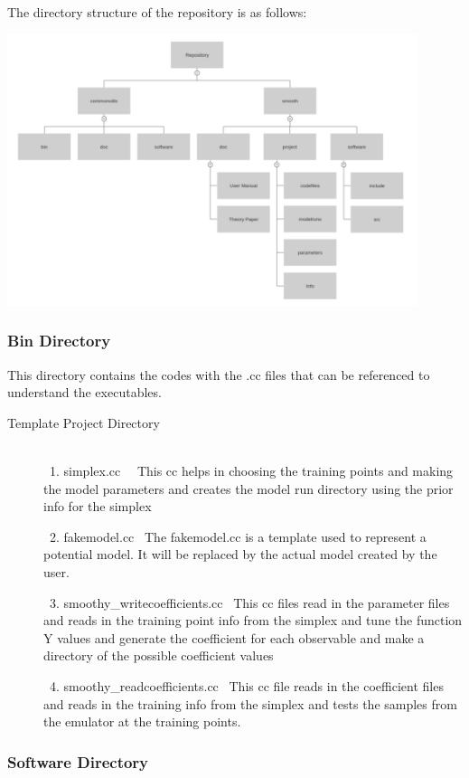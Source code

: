 \documentclass[12pt]{article}
\numberwithin{equation}{section}
\numberwithin{figure}{section}
\begin{document}
The directory structure of the repository is as follows: 

\includegraphics[width = 120mm]{Structure_Tree.png}


\subsubsection{Bin Directory}

This directory contains the codes with the .cc files that can be referenced to understand the executables.

\begin{description}
\item[Template Project Directory] \\
\ 1. simplex.cc \
\ This cc helps in choosing the training points and making the model parameters and creates the model run directory using the prior info for the simplex 

\ 2. fakemodel.cc 
\ The fakemodel.cc is a template used to represent a potential model. It will be replaced by the actual model created by the user. 

\ 3. smoothy\_writecoefficients.cc 
\ This cc files read in the parameter files and reads in the training point info from the simplex and tune the function Y values and generate the coefficient for each observable and make a directory of the possible coefficient values 

\ 4. smoothy\_readcoefficients.cc 
\ This cc file reads in the coefficient files and reads in the training info from the simplex and tests the samples from the emulator at the training points. 

\end{description}
\subsubsection{Software Directory}
\end{document}

